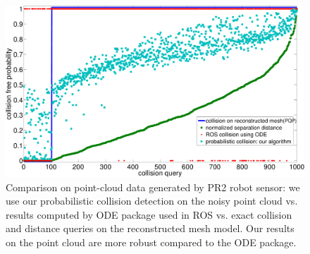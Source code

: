 \begin{figure}[htb]
\centering
\includegraphics[width=0.79\linewidth]{figs/7/pr2res.pdf}
\caption[Comparison of collision checking algorithms with and without considering data uncertainty on point-cloud data generated by PR2 robot sensor]{\label{fig:7:res2} Comparison on point-cloud data generated by PR2 robot sensor: we use our probabilistic collision detection on the noisy point
cloud vs. results computed by ODE package used in ROS vs. exact collision and distance queries on the reconstructed mesh model. Our results on the point cloud
are more robust compared to the ODE package.}
\end{figure}


